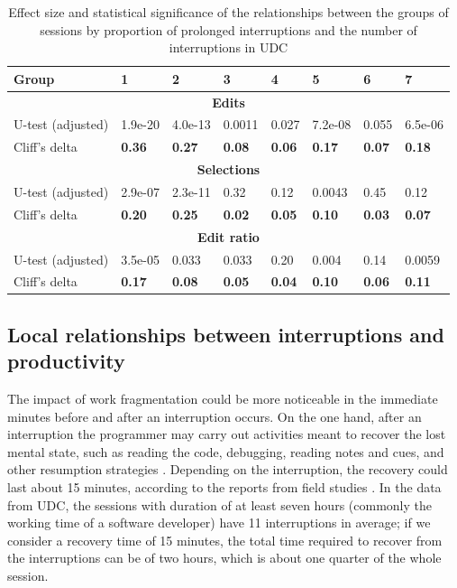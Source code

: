 \begin{table}[ht!]
	\tiny
	\renewcommand{\arraystretch}{1.3}
	\caption{Effect size and statistical significance of the relationships between the groups of sessions by proportion of prolonged interruptions and the number of interruptions in UDC}
	\label{tbl:effect_size_dur_udc}
	\centering
	\begin{tabular}{l | p{1cm} | p{1cm} | p{1cm} | p{1cm} | p{1cm} | p{1cm} | p{1cm}} 
		\hline
		Group & 1 & 2 & 3 & 4 & 5 & 6 & 7  \\  
		\hline
		\hline
		\multicolumn{8}{c}{\textbf{Edits}} \\
		\hline
		U-test (adjusted) & 1.9e-20 & 4.0e-13 & 0.0011 & 0.027 & 7.2e-08 & 0.055 & 6.5e-06\\
		\hline
		Cliff's delta & \textbf{0.36} & \textbf{0.27} & \textbf{0.08} & \textbf{0.06} & \textbf{0.17} & \textbf{0.07} & \textbf{0.18} \\
		\hline
		
		\multicolumn{8}{c}{\textbf{Selections}} \\
		\hline 
		U-test (adjusted) & 2.9e-07 & 2.3e-11 & 0.32 & 0.12 & 0.0043 & 0.45 & 0.12 \\
		\hline
		Cliff's delta & \textbf{0.20} & \textbf{0.25} & \textbf{0.02} & \textbf{0.05} & \textbf{0.10} & \textbf{0.03} & \textbf{0.07} \\  
		\hline
		
		\multicolumn{8}{c}{\textbf{Edit ratio}} \\
		\hline 
		U-test (adjusted) & 3.5e-05 & 0.033 & 0.033 & 0.20 & 0.004 & 0.14 & 0.0059 \\
		\hline 
		Cliff's delta & \textbf{0.17} & \textbf{0.08} & \textbf{0.05} & \textbf{0.04} & \textbf{0.10} & \textbf{0.06} & \textbf{0.11}  \\
		\hline
		
	\end{tabular}
\end{table}

\subsection{Local relationships between interruptions and productivity}
The impact of work fragmentation could be more noticeable in the immediate minutes before and after an interruption occurs. On the one hand, after an interruption the programmer may carry out activities meant to recover the lost mental state, such as reading the code, debugging, reading notes and cues, and other resumption strategies \cite{PR11}. Depending on the interruption, the recovery could last about 15 minutes, according to the reports from field studies \cite{IH07, SBV98}. In the data from UDC, the sessions with duration of at least seven hours (commonly the working time of a software developer) have 11 interruptions in average; if we consider a recovery time of 15 minutes, the total time required to recover from the interruptions can be of two hours, which is about one quarter of the whole session.

